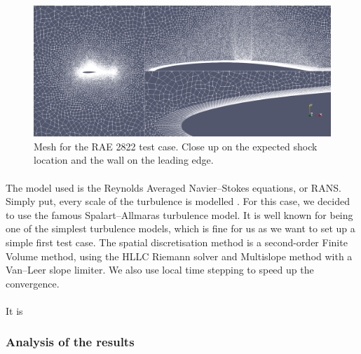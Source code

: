         \begin{figure}
          \includegraphics[width=\textwidth]{figures/rae_mesh.png}
          \caption{Mesh for the RAE 2822 test case. Close up on the expected shock location and the wall on the leading edge.}
          \label{fig:rae_mesh}
        \end{figure}

        \paragraph{}
        The model used is the Reynolds Averaged Navier--Stokes equations, or RANS.
        Simply put, every scale of the turbulence is modelled .
        For this case, we decided to use the famous Spalart--Allmaras turbulence model.
        It is well known for being one of the simplest turbulence models, which is fine for us as we want to set up a simple first test case.
        The spatial discretisation method is a second-order Finite Volume method, using the HLLC Riemann solver and Multislope method with a Van--Leer slope limiter.
        We also use local time stepping to speed up the convergence.

        \paragraph{}
        It is


      \subsubsection{Analysis of the results}

